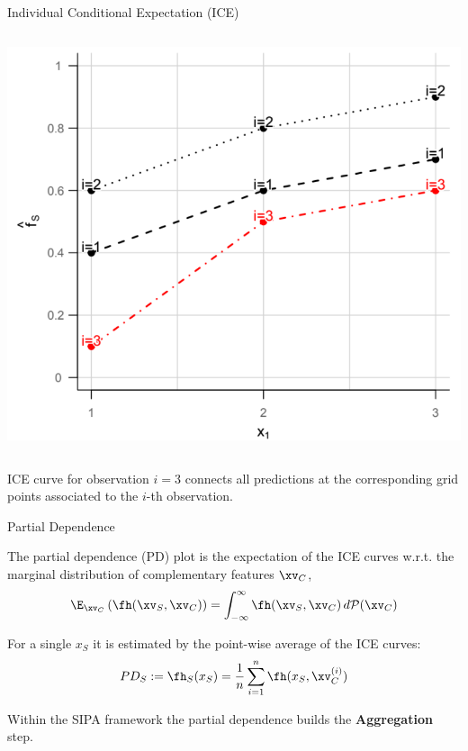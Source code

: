 \begin{vbframe}{Individual Conditional Expectation (ICE)}
\begin{onlyenv}
\begin{columns}[T]
\begin{column}{0.5\textwidth}
\begin{center}
\includegraphics[width=1\textwidth]{figure_man/ICE04.png}
\end{center}

\end{column}
\end{columns}
\end{onlyenv}

ICE curve for observation $i=3$ connects all predictions at the corresponding grid points associated to the $i$-th observation.
\end{vbframe}


\begin{vbframe}{Partial Dependence}

The partial dependence (PD) plot is the expectation of the ICE curves w.r.t. the marginal distribution of complementary features $\xv_C$,
$$\E_{\xv_C} \left( \fh(\xv_S, \xv_C) \right) = \int_{-\infty}^{\infty} \fh(\xv_S, \xv_C) \, d\mathcal{P}(\xv_C)$$

For a single $x_S$ it is estimated by the point-wise average of the ICE curves:
$$PD_S := \fh_{S}(x_S) = \frac{1}{n} \sum_{i=1}^n \fh(x_S, \xv_C^{(i)})$$

Within the SIPA framework the partial dependence builds the \textbf{Aggregation} step.

\end{vbframe}

